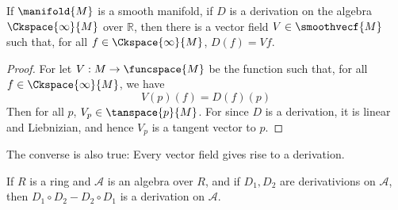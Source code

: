         \begin{theorem}
            If $\manifold{M}$ is a smooth manifold, if $D$ is a derivation
            on the algebra $\Ckspace{\infty}{M}$ over $\mathbb{R}$,
            then there is a vector field $V\in\smoothvecf{M}$ such that,
            for all $f\in\Ckspace{\infty}{M}$, $D(f)=Vf$.
        \end{theorem}
        \begin{proof}
            For let $V:M\rightarrow\funcspace{M}$ be the function such that,
            for all $f\in\Ckspace{\infty}{M}$, we have
            \begin{equation}
                V(p)(f)=D(f)(p)
            \end{equation}
            Then for all $p$, $V_{p}\in\tanspace{p}{M}$. For since $D$ is a
            derivation, it is linear and Liebnizian, and hence $V_{p}$ is a
            tangent vector to $p$.
        \end{proof}
        The converse is also true: Every vector field gives rise to a
        derivation.
        \begin{theorem}
            If $R$ is a ring and $\mathscr{A}$ is an algebra over $R$,
            and if $D_{1},D_{2}$ are derivativions on $\mathscr{A}$, then
            $D_{1}\circ{D}_{2}-D_{2}\circ{D}_{1}$ is a derivation on
            $\mathscr{A}$.
        \end{theorem}
